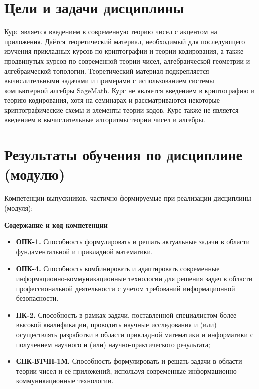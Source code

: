 \documentclass[a4paper, 12pt]{article}
\begin{document}
\section{Цели и задачи дисциплины}

Курс является введением в современную теорию чисел с акцентом на приложения. Даётся теоретический материал, необходимый для последующего изучения прикладных курсов по криптографии и теории кодирования, а также продвинутых курсов по современной теории чисел, алгебраической геометрии и алгебраической топологии. Теоретический материал подкрепляется вычислительными задачами и примерами с использованием системы компьютерной алгебры SageMath. Курс не является введением в криптографию и теорию кодирования, хотя на семинарах и рассматриваются некоторые криптографические схемы и элементы теории кодов. Курс также не является введением в вычислительные алгоритмы теории чисел и алгебры.

\section{Результаты обучения по дисциплине (модулю)}

Компетенции выпускников, частично формируемые при реализации дисциплины (модуля):

{\bf Содержание и код компетенции}
\begin{itemize}[noitemsep,topsep=0pt]
    \item {\bf ОПК-1.} Способность формулировать и решать актуальные задачи в области фундаментальной и прикладной математики.
    
    \item {\bf ОПК-4.} Способность комбинировать и адаптировать современные информационно-коммуникационные технологии для решения задач в области профессиональной деятельности с учетом требований информационной безопасности.
    
    \item {\bf ПК-2.} Способность в рамках задачи, поставленной специалистом более высокой квалификации, проводить научные исследования и (или) осуществлять разработки в области прикладной математики и информатики с получением научного и (или) научно-практического результата;
    
    \item {\bf СПК-ВТЧП-1М.} Способность формулировать и решать задачи в области теории чисел и её приложений, используя современные информационно-комму\-никационные технологии.
\end{itemize}
\end{document}
